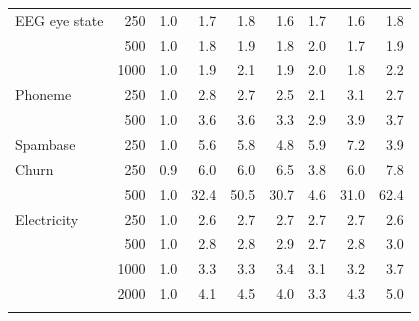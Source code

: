 \begin{tabular}{lrrrrrrrr}
\addlinespace
EEG eye state & 250 & 1.0 & 1.7 & 1.8 & 1.6 & 1.7 & 1.6 & 1.8 \\
 & 500 & 1.0 & 1.8 & 1.9 & 1.8 & 2.0 & 1.7 & 1.9 \\
 & 1000 & 1.0 & 1.9 & 2.1 & 1.9 & 2.0 & 1.8 & 2.2 \\
\addlinespace
Phoneme & 250 & 1.0 & 2.8 & 2.7 & 2.5 & 2.1 & 3.1 & 2.7 \\
 & 500 & 1.0 & 3.6 & 3.6 & 3.3 & 2.9 & 3.9 & 3.7 \\
\addlinespace
Spambase & 250 & 1.0 & 5.6 & 5.8 & 4.8 & 5.9 & 7.2 & 3.9 \\
\addlinespace
Churn & 250 & 0.9 & 6.0 & 6.0 & 6.5 & 3.8 & 6.0 & 7.8 \\
 & 500 & 1.0 & 32.4 & 50.5 & 30.7 & 4.6 & 31.0 & 62.4 \\
\addlinespace
Electricity & 250 & 1.0 & 2.6 & 2.7 & 2.7 & 2.7 & 2.7 & 2.6 \\
 & 500 & 1.0 & 2.8 & 2.8 & 2.9 & 2.7 & 2.8 & 3.0 \\
 & 1000 & 1.0 & 3.3 & 3.3 & 3.4 & 3.1 & 3.2 & 3.7 \\
 & 2000 & 1.0 & 4.1 & 4.5 & 4.0 & 3.3 & 4.3 & 5.0 \\
\addlinespace
\bottomrule\end{tabular}